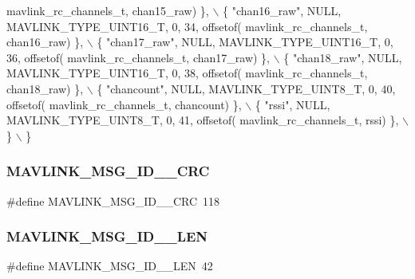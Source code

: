 \begin{DoxyCode}
      mavlink_rc_channels_t, chan15\_raw) \}, \(\backslash\)
         \{ \textcolor{stringliteral}{"chan16\_raw"}, NULL, MAVLINK_TYPE_UINT16_T, 0, 34, offsetof(
      mavlink_rc_channels_t, chan16\_raw) \}, \(\backslash\)
         \{ \textcolor{stringliteral}{"chan17\_raw"}, NULL, MAVLINK_TYPE_UINT16_T, 0, 36, offsetof(
      mavlink_rc_channels_t, chan17\_raw) \}, \(\backslash\)
         \{ \textcolor{stringliteral}{"chan18\_raw"}, NULL, MAVLINK_TYPE_UINT16_T, 0, 38, offsetof(
      mavlink_rc_channels_t, chan18\_raw) \}, \(\backslash\)
         \{ \textcolor{stringliteral}{"chancount"}, NULL, MAVLINK_TYPE_UINT8_T, 0, 40, offsetof(
      mavlink_rc_channels_t, chancount) \}, \(\backslash\)
         \{ \textcolor{stringliteral}{"rssi"}, NULL, MAVLINK_TYPE_UINT8_T, 0, 41, offsetof(
      mavlink_rc_channels_t, rssi) \}, \(\backslash\)
         \} \(\backslash\)
\}
\end{DoxyCode}
\mbox{\label{mavlink__msg__rc__channels_8h_ac9d094e9346fc93890ad4c1e2e6a1937}} 
\subsubsection{M\+A\+V\+L\+I\+N\+K\+\_\+\+M\+S\+G\+\_\+\+I\+D\+\_\+\_\+\+C\+RC}
{\footnotesize\ttfamily \#define M\+A\+V\+L\+I\+N\+K\+\_\+\+M\+S\+G\+\_\+\+I\+D\+\_\+\_\+\+C\+RC~118}

\mbox{\label{mavlink__msg__rc__channels_8h_a671a2dc14ebec75cb4434e488ed81881}} 
\subsubsection{M\+A\+V\+L\+I\+N\+K\+\_\+\+M\+S\+G\+\_\+\+I\+D\+\_\+\_\+\+L\+EN}
{\footnotesize\ttfamily \#define M\+A\+V\+L\+I\+N\+K\+\_\+\+M\+S\+G\+\_\+\+I\+D\+\_\+\_\+\+L\+EN~42}


